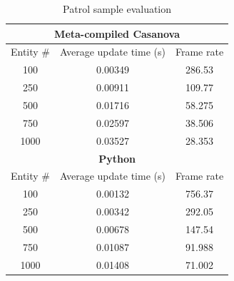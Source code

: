 \begin{table}
	\centering
	\begin{tabular}{|c|c|c|}
		\hline
		\multicolumn{3}{|c|}{\textbf{Meta-compiled Casanova}} \\
		\hline
		Entity \# & Average update time (s) & Frame rate \\
		\hline
		100 & 0.00349 & 286.53 \\
		\hline
		250 & 0.00911 & 109.77 \\
		\hline
		500 & 0.01716 & 58.275 \\
		\hline
		750 & 0.02597 & 38.506 \\
		\hline
		1000 & 0.03527 & 28.353 \\
		\hline
		\multicolumn{3}{|c|}{\textbf{Python}} \\
		\hline
		Entity \# & Average update time (s) & Frame rate \\
		\hline
		100 & 0.00132 & 756.37 \\
		\hline
		250 & 0.00342 & 292.05 \\
		\hline
		500 & 0.00678 & 147.54 \\
		\hline
		750 & 0.01087 & 91.988 \\
		\hline
		1000 & 0.01408 & 71.002 \\
		\hline
	\end{tabular}
	\caption{Patrol sample evaluation}
	\label{tab:ch_mcnv_casanova_evaluation}
\end{table}

